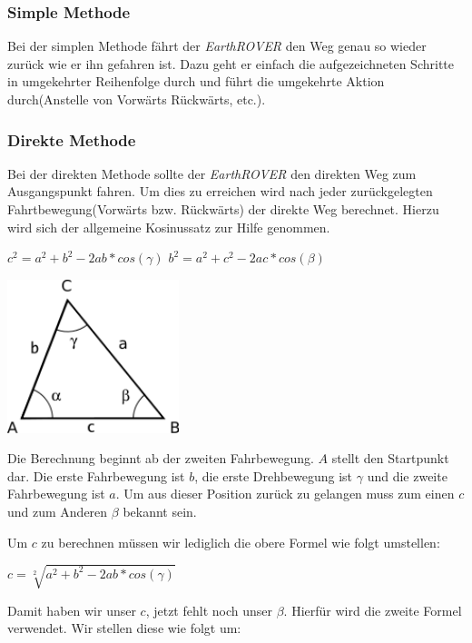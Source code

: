 \subsubsection{Simple Methode}
\label{lbl:simplemethod}
Bei der simplen Methode fährt der \textit{EarthROVER} den Weg genau so wieder zurück wie er ihn gefahren ist. Dazu geht er einfach die aufgezeichneten Schritte in umgekehrter Reihenfolge durch und führt die umgekehrte Aktion durch(Anstelle von Vorwärts Rückwärts, etc.).

\subsubsection{Direkte Methode}
Bei der direkten Methode sollte der \textit{EarthROVER} den direkten Weg zum Ausgangspunkt fahren. Um dies zu erreichen wird nach jeder zurückgelegten Fahrtbewegung(Vorwärts bzw. Rückwärts) der direkte Weg berechnet. Hierzu wird sich der allgemeine Kosinussatz zur Hilfe genommen.

\begin{capdefinition}	
	$c^2 = a^2 + b^2 - 2ab*cos(\gamma)$
	$b^2 = a^2 + c^2 - 2ac*cos(\beta)$
\end{capdefinition}

\begin{capfigure}[Kosinussatz]
	\includegraphics[width=5cm]{images/implementation/cosinus}
\end{capfigure}

Die Berechnung beginnt ab der zweiten Fahrbewegung. $A$ stellt den Startpunkt dar. Die erste Fahrbewegung ist $b$, die erste Drehbewegung ist $\gamma$ und die zweite Fahrbewegung ist $a$. Um aus dieser Position zurück zu gelangen muss zum einen $c$ und zum Anderen $\beta$ bekannt sein.

Um $c$ zu berechnen müssen wir lediglich die obere Formel wie folgt umstellen:

$c = \sqrt[2]{a^2 + b^2 - 2ab*cos(\gamma)}$

Damit haben wir unser $c$, jetzt fehlt noch unser $\beta$. Hierfür wird die zweite Formel verwendet. Wir stellen diese wie folgt um:

